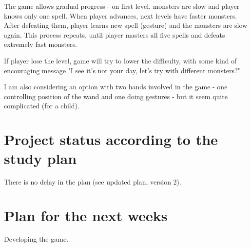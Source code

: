 \documentclass[10pt,a4paper]{article}
\begin{document}
The game allows gradual progress - on first level, monsters are slow and player knows only one spell. When player advances, next levels have faster monsters. After defeating them, player learns new spell (gesture) and the monsters are slow again. This process repeats, until player masters all five spells and defeats extremely fast monsters.

If player lose the level, game will try to lower the difficulty, with some kind of encouraging message "I see it's not your day, let's try with different monsters?" 

I am also considering an option with two hands involved in the game - one controlling position of the wand and one doing gestures - but it seem quite complicated (for a child).

\section*{Project status according to the study plan}
There is no delay in the plan (see updated plan, version 2). 

\section*{Plan for the next weeks}
Developing the game. 



\end{document}
